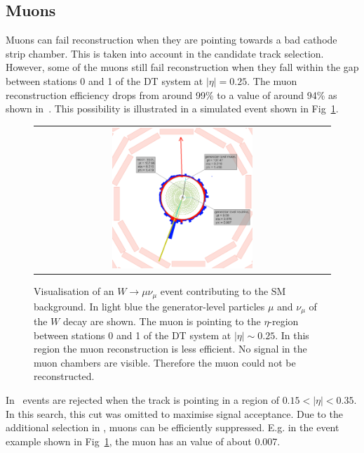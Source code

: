\subsection*{Muons}
Muons can fail reconstruction when they are pointing towards a bad cathode strip chamber.
This is taken into account in the candidate track selection.
However, some of the muons still fail reconstruction when they fall within the gap between stations 0 and 1 of the DT system at $|\eta|=0.25$.
The muon reconstruction efficiency drops from around 99\% to a value of around 94\% as shown in~\cite{bib:CMS:DT_Thesis,bib:CMS:DT_8TeV_AN}.
This possibility is illustrated in a simulated event shown in Fig~\ref{fig:LostMuon}.
\begin{figure}[!tb]
  \centering 
  \begin{tabular}{c}
    \includegraphics[width=0.49\textwidth]{figures/analysis/Background/LostMuon_Lumi_456307_event_182377157.png}
  \end{tabular}
  \caption{Visualisation of an $W\rightarrow \mu\nu_{\mu}$ event contributing to the SM background. 
           In light blue the generator-level particles $\mu$ and $\nu_{\mu}$ of the $W$ decay are shown. 
           The muon is pointing to the $\eta$-region between stations 0 and 1 of the DT system at $|\eta|\sim0.25$.
           In this region the muon reconstruction is less efficient. No signal in the muon chambers are visible. Therefore the  muon could not be reconstructed.}
  \label{fig:LostMuon}
\end{figure}


In~\cite{bib:CMS:DT_Thesis,bib:CMS:DT_8TeV_AN} events are rejected when the track is pointing in a region of $0.15<|\eta|<0.35$.
In this search, this cut was omitted to maximise signal acceptance. 
Due to the additional selection in \ias, muons can be efficiently suppressed.
E.g. in the event example shown in Fig~\ref{fig:LostMuon}, the muon has an \ias value of about 0.007.\\


